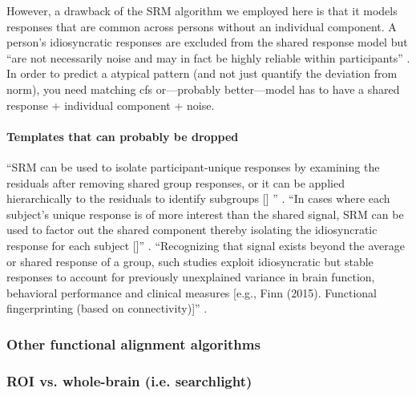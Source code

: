However, a drawback of the SRM algorithm we employed here is that it models
responses that are common across persons without an individual component.
%
A person's idiosyncratic responses are excluded from the shared response model
but ``are not necessarily noise and may in fact be highly reliable within
participants'' \citep{cohen2017computational}.
%
In order to predict a atypical pattern (and not just quantify the deviation from
norm), you need matching \ac{cfs} or---probably better---model has to have a
shared response + individual component + noise.


\paragraph{Templates that can probably be dropped}
%
``SRM can be used to isolate participant-unique responses by examining the
residuals after removing shared group responses, or it can be applied
hierarchically to the residuals to identify subgroups [\citet{chen2017shared}]
'' \citep{cohen2017computational}.
%
``In cases where each subject's unique response is of more interest than the
shared signal, SRM can be used to factor out the shared component thereby
isolating the idiosyncratic response for each subject
[\citep{chen2015reduced}]'' \citep{kumar2020brainiak}.
%
``Recognizing that signal exists beyond the average or shared response of a
group, such studies exploit idiosyncratic but stable responses to account for
previously unexplained variance in brain function, behavioral performance and
clinical measures [e.g., Finn (2015). Functional fingerprinting (based on
connectivity)]'' \citep{cohen2017computational}.




\subsubsection{Other functional alignment algorithms}



\subsubsection{ROI vs. whole-brain (i.e. searchlight)}

